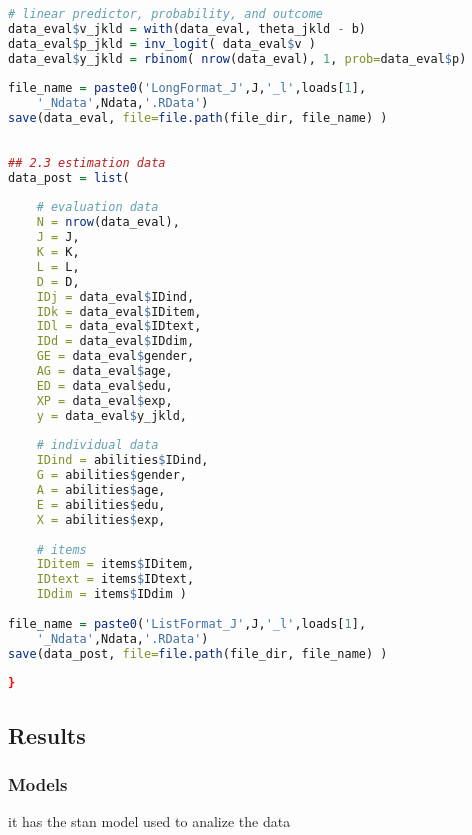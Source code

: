\begin{lstlisting}[language=R]
# linear predictor, probability, and outcome
data_eval$v_jkld = with(data_eval, theta_jkld - b)
data_eval$p_jkld = inv_logit( data_eval$v )
data_eval$y_jkld = rbinom( nrow(data_eval), 1, prob=data_eval$p)
		
file_name = paste0('LongFormat_J',J,'_l',loads[1],
	'_Ndata',Ndata,'.RData')
save(data_eval, file=file.path(file_dir, file_name) )
		
	
## 2.3 estimation data
data_post = list(
		
	# evaluation data
	N = nrow(data_eval),
	J = J,
	K = K,
	L = L,
	D = D,
	IDj = data_eval$IDind,
	IDk = data_eval$IDitem,
	IDl = data_eval$IDtext,
	IDd = data_eval$IDdim,
	GE = data_eval$gender,
	AG = data_eval$age,
	ED = data_eval$edu,
	XP = data_eval$exp,
	y = data_eval$y_jkld,
		
	# individual data
	IDind = abilities$IDind,
	G = abilities$gender,
	A = abilities$age,
	E = abilities$edu,
	X = abilities$exp,
		
	# items
	IDitem = items$IDitem,
	IDtext = items$IDtext,
	IDdim = items$IDdim )
		
file_name = paste0('ListFormat_J',J,'_l',loads[1],
	'_Ndata',Ndata,'.RData')
save(data_post, file=file.path(file_dir, file_name) )
		
}
\end{lstlisting}






\subsection{Results} \label{appC2_2:results}

\subsubsection{Models}

it has the stan model used to analize the data \\

